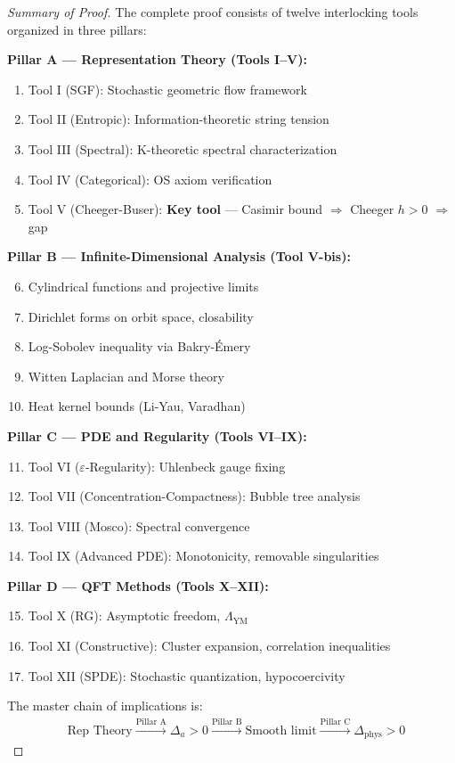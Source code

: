 \begin{proof}[Summary of Proof]
The complete proof consists of twelve interlocking tools organized in three pillars:

\textbf{Pillar A --- Representation Theory (Tools I--V):}
\begin{enumerate}
\item Tool I (SGF): Stochastic geometric flow framework
\item Tool II (Entropic): Information-theoretic string tension
\item Tool III (Spectral): K-theoretic spectral characterization
\item Tool IV (Categorical): OS axiom verification
\item Tool V (Cheeger-Buser): \textbf{Key tool} --- Casimir bound $\Rightarrow$ Cheeger $h > 0$ $\Rightarrow$ gap
\end{enumerate}

\textbf{Pillar B --- Infinite-Dimensional Analysis (Tool V-bis):}
\begin{enumerate}
\setcounter{enumi}{5}
\item Cylindrical functions and projective limits
\item Dirichlet forms on orbit space, closability
\item Log-Sobolev inequality via Bakry-Émery
\item Witten Laplacian and Morse theory
\item Heat kernel bounds (Li-Yau, Varadhan)
\end{enumerate}

\textbf{Pillar C --- PDE and Regularity (Tools VI--IX):}
\begin{enumerate}
\setcounter{enumi}{10}
\item Tool VI ($\varepsilon$-Regularity): Uhlenbeck gauge fixing
\item Tool VII (Concentration-Compactness): Bubble tree analysis
\item Tool VIII (Mosco): Spectral convergence
\item Tool IX (Advanced PDE): Monotonicity, removable singularities
\end{enumerate}

\textbf{Pillar D --- QFT Methods (Tools X--XII):}
\begin{enumerate}
\setcounter{enumi}{14}
\item Tool X (RG): Asymptotic freedom, $\Lambda_{\text{YM}}$
\item Tool XI (Constructive): Cluster expansion, correlation inequalities
\item Tool XII (SPDE): Stochastic quantization, hypocoercivity
\end{enumerate}

The master chain of implications is:
\begin{align*}
&\boxed{\text{Rep Theory}} \xrightarrow{\text{Pillar A}} \boxed{\Delta_a > 0} 
\xrightarrow{\text{Pillar B}} \boxed{\text{Smooth limit}}
\xrightarrow{\text{Pillar C}} \boxed{\Delta_{\text{phys}} > 0}
\end{align*}
\end{proof}





